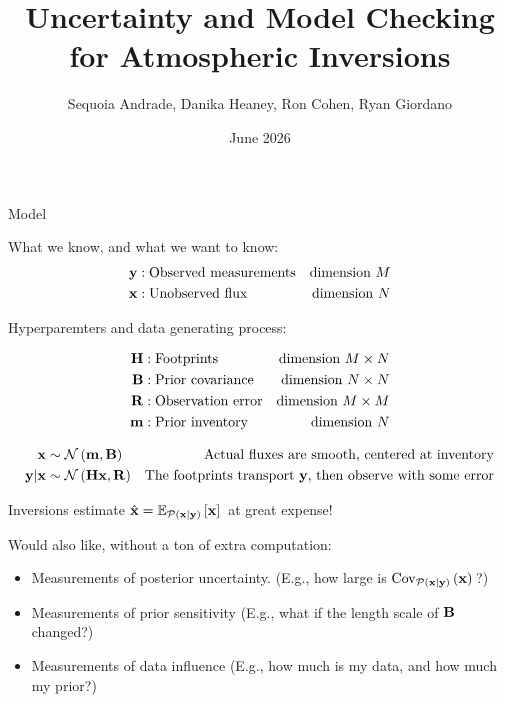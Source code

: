 \documentclass[8pt]{beamer}\usepackage[]{graphicx}\usepackage[]{color}
\title{Uncertainty and Model Checking for Atmospheric Inversions}
\author{Sequoia Andrade, Danika Heaney, Ron Cohen, Ryan Giordano}
\date{June 2026}
\begin{document}
\maketitle


\def\sectionslide#1{
\begin{frame}
   \centering
   \huge{\textbf{#1}}
\end{frame}
}


\begin{frame}{Model}

What we know, and what we want to know:
%
$$
\begin{aligned}
\mathbf{y}:{}& \textrm{Observed measurements} &\textrm{dimension } M\\
\mathbf{x}:{}& \textrm{Unobserved flux} &\textrm{dimension } N\\
\end{aligned}
$$

Hyperparemters and data generating process:

$$
\begin{aligned}
\mathbf{H}:{}& \textrm{Footprints} &\textrm{dimension } M \times N\\
\mathbf{B}:{}& \textrm{Prior covariance} &\textrm{dimension } N \times N\\
\mathbf{R}:{}& \textrm{Observation error} &\textrm{dimension } M \times M\\
\mathbf{m}:{}& \textrm{Prior inventory} &\textrm{dimension } N\\
\end{aligned}
$$

$$
\begin{aligned}
\mathbf{x} \sim{}& \mathcal{N}\left( \mathbf{m}, \mathbf{B}\right) & 
   \textrm{Actual fluxes are smooth, centered at inventory} \\
\mathbf{y} \vert \mathbf{x} \sim{}& \mathcal{N}\left( \mathbf{H} \mathbf{x}, \mathbf{R}\right) & 
   \textrm{The footprints transport }\mathbf{y}\textrm{, then observe with some error} \\
\end{aligned}
$$

\pause

Inversions estimate $\hat{\mathbf{x}} = \mathbb{E}_{\mathcal{P}(\mathbf{x} \vert \mathbf{y})}\left[ \mathbf{x}\right]\,$ at great expense!   

Would also like, without a ton of extra computation:
%
\begin{itemize}
\item Measurements of posterior uncertainty. (E.g., how large is $\mathrm{Cov}_{\mathcal{P}(\mathbf{x} \vert \mathbf{y})}\left( \mathbf{x}\right)\,$?)
\item Measurements of prior sensitivity (E.g., what if the length scale of $\mathbf{B}$ changed?)
\item Measurements of data influence (E.g., how much is my data, and how much my prior?)
\end{itemize}
%


\end{frame}
\end{document}
